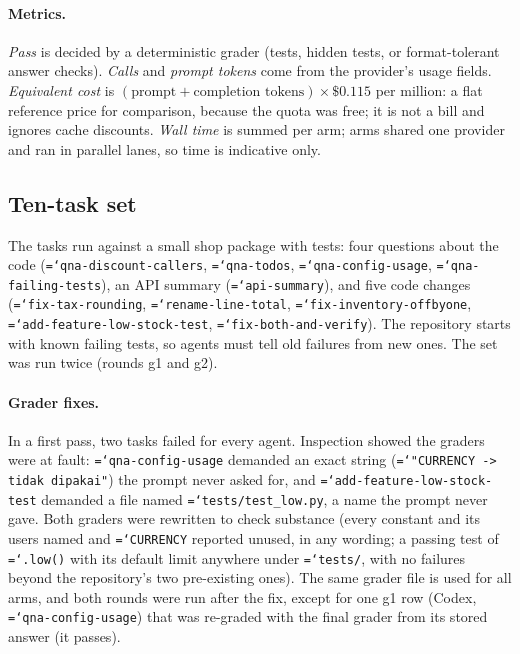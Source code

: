 \documentclass[11pt]{article}
\newcommand{\code}[1]{\texttt{\hyphenchar\font=`\-\relax #1}}
\begin{document}
\paragraph{Metrics.} \emph{Pass} is decided by a deterministic grader (tests, hidden tests, or format-tolerant answer checks). \emph{Calls} and \emph{prompt tokens} come from the provider's usage fields.
\emph{Equivalent cost} is $(\text{prompt}+\text{completion tokens}) \times \$0.115$ per million: a flat reference price for comparison, because the quota was free; it is not a bill and ignores cache discounts.
\emph{Wall time} is summed per arm; arms shared one provider and ran in parallel lanes, so time is indicative only.

\subsection{Ten-task set}

The tasks run against a small shop package with tests: four questions about the code (\code{qna-discount-callers}, \code{qna-todos}, \code{qna-config-usage}, \code{qna-failing-tests}), an API summary
(\code{api-summary}), and five code changes (\code{fix-tax-rounding}, \code{rename-line-total}, \code{fix-inventory-offbyone}, \code{add-feature-low-stock-test}, \code{fix-both-and-verify}).
The repository starts with known failing tests, so agents must tell old failures from new ones. The set was run twice (rounds g1 and g2).

\paragraph{Grader fixes.} In a first pass, two tasks failed for every agent. Inspection showed the graders were at fault: \code{qna-config-usage} demanded an exact string
(\code{"CURRENCY -> tidak dipakai"}) the prompt never asked for, and \code{add-feature-low-stock-test} demanded a file named \code{tests/test\_low.py}, a name the prompt never gave.
Both graders were rewritten to check substance (every constant and its users named and \code{CURRENCY} reported unused, in any wording; a passing test of \code{.low()} with its default
limit anywhere under \code{tests/}, with no failures beyond the repository's two pre-existing ones). The same grader file is used for all arms, and both rounds were run after the fix, except
for one g1 row (Codex, \code{qna-config-usage}) that was re-graded with the final grader from its stored answer (it passes).
\end{document}
